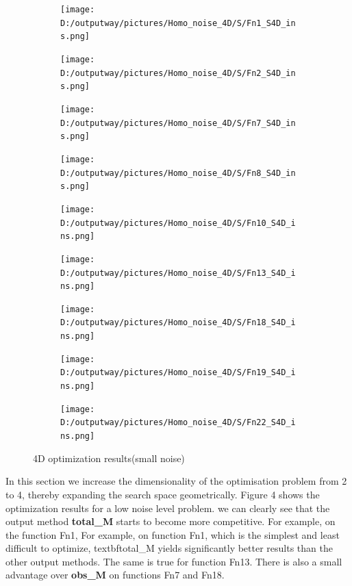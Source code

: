 \documentclass{article}
\begin{document}
\begin{figure}[H]
    \centering
    \begin{subfigure}[t]{.32\linewidth}
        \centering
        \texttt{[image: D:/outputway/pictures/Homo\_noise\_4D/S/Fn1\_S4D\_ins.png]}
    \end{subfigure}
    \begin{subfigure}[t]{.32\linewidth}
        \centering
        \texttt{[image: D:/outputway/pictures/Homo\_noise\_4D/S/Fn2\_S4D\_ins.png]}
    \end{subfigure}
    \begin{subfigure}[t]{.32\linewidth}
        \centering
        \texttt{[image: D:/outputway/pictures/Homo\_noise\_4D/S/Fn7\_S4D\_ins.png]}
    \end{subfigure}
    \begin{subfigure}[t]{.32\linewidth}
        \centering
        \texttt{[image: D:/outputway/pictures/Homo\_noise\_4D/S/Fn8\_S4D\_ins.png]}
    \end{subfigure}
    \begin{subfigure}[t]{.32\linewidth}
        \centering
        \texttt{[image: D:/outputway/pictures/Homo\_noise\_4D/S/Fn10\_S4D\_ins.png]}
    \end{subfigure}
    \begin{subfigure}[t]{.32\linewidth}
        \centering
        \texttt{[image: D:/outputway/pictures/Homo\_noise\_4D/S/Fn13\_S4D\_ins.png]}
    \end{subfigure}
    \begin{subfigure}[t]{.32\linewidth}
        \centering
        \texttt{[image: D:/outputway/pictures/Homo\_noise\_4D/S/Fn18\_S4D\_ins.png]}
    \end{subfigure}
    \begin{subfigure}[t]{.32\linewidth}
        \centering
        \texttt{[image: D:/outputway/pictures/Homo\_noise\_4D/S/Fn19\_S4D\_ins.png]}
    \end{subfigure}
    \begin{subfigure}[t]{.32\linewidth}
        \centering
        \texttt{[image: D:/outputway/pictures/Homo\_noise\_4D/S/Fn22\_S4D\_ins.png]}
    \end{subfigure}
    \caption{4D optimization results(small noise)}
    \label{Fig4}
\end{figure}

\hspace{2em}In this section we increase the dimensionality of the optimisation problem from 2 to 4, thereby expanding the search space geometrically. Figure 4 shows the optimization results for a low noise level problem. we can clearly see that the output method \textbf{total\_M} starts to become more competitive. For example, on the function Fn1, For example, on function Fn1, which is the simplest and least difficult to optimize, textbf{total\_M} yields significantly better results than the other output methods. The same is true for function Fn13. There is also a small advantage over \textbf{obs\_M} on functions Fn7 and Fn18. 
\end{document}
